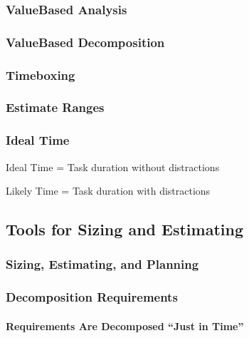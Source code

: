 \documentclass[letterpaper,10pt,english]{jupyterBook}
\begin{document}
\subsubsection{Value\sphinxhyphen{}Based Analysis}
\label{\detokenize{APM/agile:value-based-analysis}}

\subsubsection{Value\sphinxhyphen{}Based Decomposition}
\label{\detokenize{APM/agile:value-based-decomposition}}

\subsubsection{Timeboxing}
\label{\detokenize{APM/agile:timeboxing}}

\subsubsection{Estimate Ranges}
\label{\detokenize{APM/agile:estimate-ranges}}

\subsubsection{Ideal Time}
\label{\detokenize{APM/agile:ideal-time}}
\sphinxAtStartPar
Ideal Time = Task duration without distractions

\sphinxAtStartPar
Likely Time = Task duration with distractions


\subsection{Tools for Sizing and Estimating}
\label{\detokenize{APM/agile:tools-for-sizing-and-estimating}}

\subsubsection{Sizing, Estimating, and Planning}
\label{\detokenize{APM/agile:sizing-estimating-and-planning}}

\subsubsection{Decomposition Requirements}
\label{\detokenize{APM/agile:decomposition-requirements}}

\paragraph{Requirements Are Decomposed “Just in Time”}
\label{\detokenize{APM/agile:requirements-are-decomposed-just-in-time}}
\end{document}
